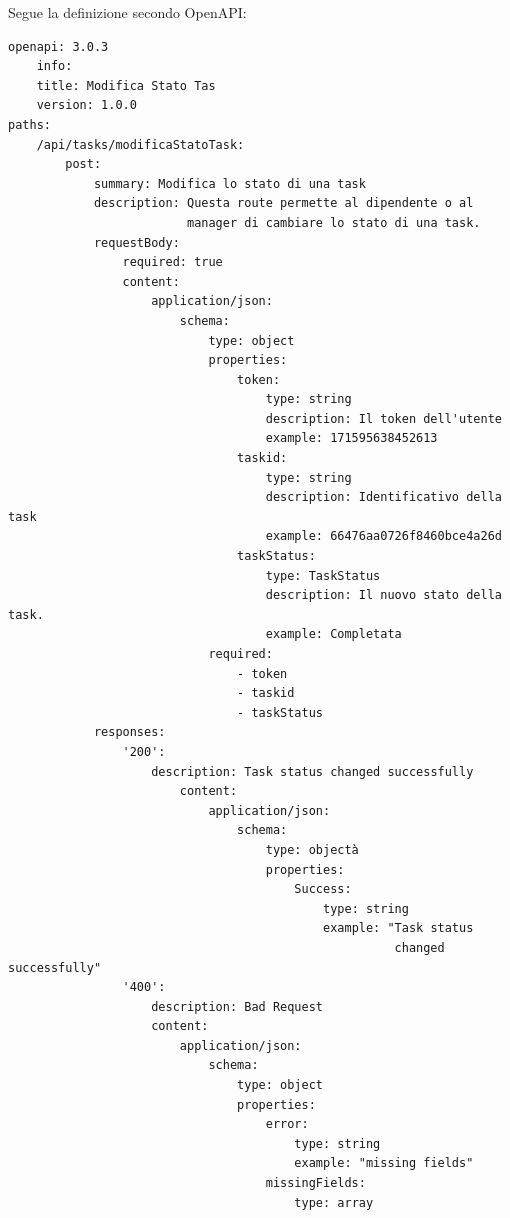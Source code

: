 \documentclass{report}
\begin{document}
Segue la definizione secondo OpenAPI:

\begin{verbatim}
openapi: 3.0.3
    info:
    title: Modifica Stato Tas
    version: 1.0.0
paths:
    /api/tasks/modificaStatoTask:
        post:
            summary: Modifica lo stato di una task
            description: Questa route permette al dipendente o al
                         manager di cambiare lo stato di una task.
            requestBody:
                required: true
                content:
                    application/json:
                        schema:
                            type: object
                            properties:
                                token:
                                    type: string
                                    description: Il token dell'utente
                                    example: 171595638452613
                                taskid:
                                    type: string
                                    description: Identificativo della task
                                    example: 66476aa0726f8460bce4a26d
                                taskStatus:
                                    type: TaskStatus
                                    description: Il nuovo stato della task.
                                    example: Completata
                            required:
                                - token
                                - taskid
                                - taskStatus
            responses:
                '200':
                    description: Task status changed successfully
                        content:
                            application/json:
                                schema:
                                    type: objectà
                                    properties:
                                        Success:
                                            type: string
                                            example: "Task status
                                                      changed successfully"
                '400':
                    description: Bad Request
                    content:
                        application/json:
                            schema:
                                type: object
                                properties:
                                    error:
                                        type: string
                                        example: "missing fields"
                                    missingFields:
                                        type: array

\end{verbatim}
\end{document}
